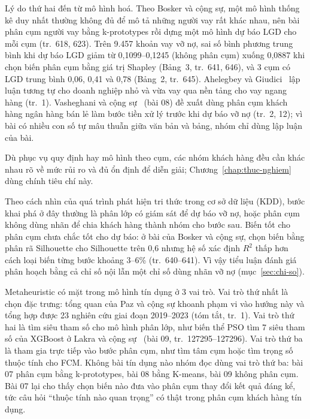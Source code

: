 Lý do thứ hai đến từ mô hình hoá. Theo Bosker và cộng sự, một mô hình thống kê duy nhất thường không đủ để mô tả những
người vay rất khác nhau, nên bài phân cụm người vay bằng k-prototypes rồi dựng một mô hình dự báo LGD cho mỗi cụm (tr.~618,
623). Trên 9.457 khoản vay vỡ nợ, sai số bình phương trung bình khi dự báo LGD giảm từ 0,1099--0,1245 (không phân cụm)
xuống 0,0887 khi chọn biến phân cụm bằng giá trị Shapley (Bảng~3, tr.~641, 646), và 3 cụm có LGD trung bình 0,06, 0,41 và
0,78 (Bảng~2, tr.~645). Ahelegbey và Giudici~\cite{ahelegbey2023p2p} lập luận tương tự cho doanh nghiệp nhỏ và vừa vay qua
nền tảng cho vay ngang hàng (tr.~1). Vasheghani và cộng sự~\cite{vasheghani2025loan} (bài 08) đề xuất dùng phân cụm khách
hàng ngân hàng bán lẻ làm bước tiền xử lý trước khi dự báo vỡ nợ (tr.~2, 12); vì bài có nhiều con số tự mâu thuẫn giữa văn
bản và bảng, nhóm chỉ dùng lập luận của bài.

Dù phục vụ quy định hay mô hình theo cụm, các nhóm khách hàng đều cần khác nhau rõ về mức rủi ro và đủ ổn định để diễn
giải; Chương~\ref{chap:thuc-nghiem} dùng chính tiêu chí này.

Theo cách nhìn của quá trình phát hiện tri thức trong cơ sở dữ liệu (KDD), bước khai phá ở đây thường là phân lớp có giám
sát để dự báo vỡ nợ, hoặc phân cụm không dùng nhãn để chia khách hàng thành nhóm cho bước sau. Biến tốt cho phân cụm
chưa chắc tốt cho dự báo: ở bài của Bosker và cộng sự, chọn biến bằng phân rã Silhouette cho Silhouette trên 0,6 nhưng hệ số xác định $R^2$ thấp
hơn cách loại biến từng bước khoảng 3--6\% (tr.~640--641). Vì vậy tiểu luận đánh giá phân hoạch bằng cả chỉ số nội lẫn một
chỉ số dùng nhãn vỡ nợ (mục~\ref{sec:chi-so}).

Metaheuristic có mặt trong mô hình tín dụng ở 3 vai trò. Vai trò thứ nhất là chọn đặc trưng: tổng quan của Paz và cộng sự
khoanh phạm vi vào hướng này và tổng hợp được 23 nghiên cứu giai đoạn 2019--2023 (tóm tắt, tr.~1). Vai trò thứ hai là tìm siêu tham số cho mô hình phân lớp, như
biến thể PSO tìm 7 siêu tham số của XGBoost ở Lakra và cộng sự~\cite{lakra2025wcapso} (bài 09, tr.~127295--127296). Vai
trò thứ ba là tham gia trực tiếp vào bước phân cụm, như tìm tâm cụm hoặc tìm trọng số thuộc tính cho FCM. Không bài tín
dụng nào nhóm đọc dùng vai trò thứ ba: bài 07 phân cụm bằng k-prototypes, bài 08 bằng K-means, bài 09 không phân cụm. Bài
07 lại cho thấy chọn biến nào đưa vào phân cụm thay đổi kết quả đáng kể, tức câu hỏi ``thuộc tính nào quan trọng'' có thật
trong phân cụm khách hàng tín dụng.

